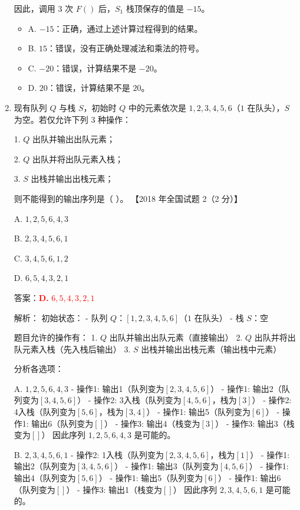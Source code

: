 \documentclass[lang=cn,newtx,10pt,scheme=chinese]{../../../elegantbook}
\begin{document}
\begin{enumerate}
    因此，调用 3 次 $F()$ 后，$S_1$ 栈顶保存的值是 $-15$。

    \begin{itemize}
        \item A. $-15$：正确，通过上述计算过程得到的结果。
        \item B. $15$：错误，没有正确处理减法和乘法的符号。
        \item C. $-20$：错误，计算结果不是 $-20$。
        \item D. $20$：错误，计算结果不是 $20$。
    \end{itemize}

    \item 现有队列 $Q$ 与栈 $S$，初始时 $Q$ 中的元素依次是 $1, 2, 3, 4, 5, 6$（$1$ 在队头），$S$ 为空。若仅允许下列 3 种操作：  
    
    1. $Q$ 出队并输出出队元素；  

    2. $Q$ 出队并将出队元素入栈；

    3. $S$ 出栈并输出出栈元素；  

    则不能得到的输出序列是（ ）。  
    【2018 年全国试题 2（2 分）】  

    A. $1, 2, 5, 6, 4, 3$  

    B. $2, 3, 4, 5, 6, 1$  

    C. $3, 4, 5, 6, 1, 2$  

    D. $6, 5, 4, 3, 2, 1$  

    答案：\textcolor{red}{\textbf{D.} $6, 5, 4, 3, 2, 1$}

    解析：
    初始状态：
    - 队列 $Q$：$[1, 2, 3, 4, 5, 6]$（$1$ 在队头）
    - 栈 $S$：空

    题目允许的操作有：
    1. $Q$ 出队并输出出队元素（直接输出）
    2. $Q$ 出队并将出队元素入栈（先入栈后输出）
    3. $S$ 出栈并输出出栈元素（输出栈中元素）

    分析各选项：

    A. $1, 2, 5, 6, 4, 3$
    - 操作1: 输出1（队列变为$[2,3,4,5,6]$）
    - 操作1: 输出2（队列变为$[3,4,5,6]$）
    - 操作2: 3入栈（队列变为$[4,5,6]$，栈为$[3]$）
    - 操作2: 4入栈（队列变为$[5,6]$，栈为$[3,4]$）
    - 操作1: 输出5（队列变为$[6]$）
    - 操作1: 输出6（队列变为$[]$）
    - 操作3: 输出4（栈变为$[3]$）
    - 操作3: 输出3（栈变为$[]$）
    因此序列 $1, 2, 5, 6, 4, 3$ 是可能的。

    B. $2, 3, 4, 5, 6, 1$
    - 操作2: 1入栈（队列变为$[2,3,4,5,6]$，栈为$[1]$）
    - 操作1: 输出2（队列变为$[3,4,5,6]$）
    - 操作1: 输出3（队列变为$[4,5,6]$）
    - 操作1: 输出4（队列变为$[5,6]$）
    - 操作1: 输出5（队列变为$[6]$）
    - 操作1: 输出6（队列变为$[]$）
    - 操作3: 输出1（栈变为$[]$）
    因此序列 $2, 3, 4, 5, 6, 1$ 是可能的。


\end{enumerate}
\end{document}
